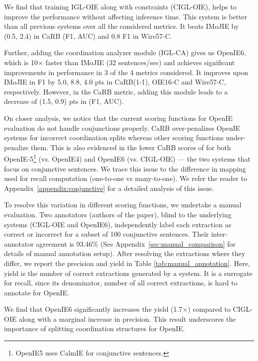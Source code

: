 \documentclass[11pt,a4paper]{article}
\newcommand{\shortname}{{\scshape IGL}}
\begin{document}
We find that training \shortname-OIE along with constraints (C\shortname-OIE), helps to improve the performance without affecting inference time. 
This system is better than all previous systems over all the considered metrics. It beats IMoJIE by (0.5, 2.4) in CaRB (F1, AUC) and 0.8 F1 in Wire57-C. 


Further, adding the coordination analyzer module (\shortname-CA) gives us OpenIE6, which is 10$\times$ faster than IMoJIE (32 sentences/sec) and achieves significant improvements in performance in 3 of the 4 metrics considered. It improves upon IMoJIE in F1 by 5.0, 8.8, 4.0 pts in CaRB(1-1), OIE16-C and Wire57-C, respectively. However, in the CaRB metric, adding this module leads to a decrease of (1.5, 0.9) pts in (F1, AUC).


On closer analysis, we notice that the current scoring functions for OpenIE evaluation do not handle conjunctions properly. CaRB over-penalizes OpenIE systems for incorrect coordination splits whereas other scoring functions under-penalize them. This is also evidenced in the lower CaRB scores of for both OpenIE-5\footnote{OpenIE5 uses CalmIE for conjunctive sentences.} (vs. OpenIE4) and
OpenIE6
(vs. C\shortname-OIE) --- the two systems that focus on conjunctive sentences. We trace this issue to the difference in mapping used for recall computation (one-to-one vs many-to-one). We refer the reader to Appendix~\ref{appendix:conjunctive} for a detailed analysis of this issue.


To resolve this variation in different scoring functions, we undertake a manual evaluation. Two annotators (authors of the paper), blind to the underlying systems (C\shortname-OIE and
OpenIE6),
independently label each extraction as correct or incorrect for a subset of 100 conjunctive sentences. Their inter-annotator agreement is 93.46\% (See Appendix~\ref{sec:manual_comparison} for details of manual annotation setup). After resolving the extractions where they differ, we report the precision and yield in Table \ref{tab:manual_annotation}. Here, yield is the number of correct extractions generated by a system. It is a surrogate for recall, since its denominator, number of all correct extractions, is hard to annotate for OpenIE.  

We find that
OpenIE6
significantly increases the yield (1.7$\times$) compared to C\shortname-OIE along with a marginal increase in precision. This result underscores the importance of splitting coordination structures for 
OpenIE. 
\end{document}
